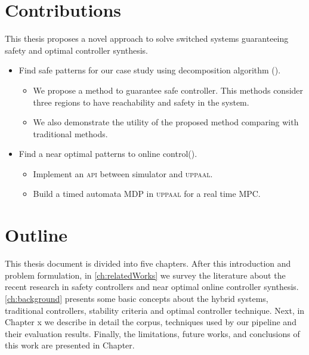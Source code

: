     \section{Contributions}
    \label{sec:contributions}
        This thesis proposes a novel approach to solve 
        switched systems guaranteeing safety and optimal
        controller synthesis. 
        \begin{itemize}
            \item Find safe patterns for our case study using
            decomposition algorithm (\cite{le2017improved}).
                \begin{itemize}
                    \item We propose a method to guarantee safe controller. This methods consider three regions to have reachability and safety in the system.
                    \item We also demonstrate the utility of the proposed method comparing with traditional methods.
                \end{itemize}
            \item Find a near optimal patterns to online control(\cite{larsen2016online}).
            \begin{itemize}
                \item Implement an \textsc{api} between simulator and \textsc{uppaal}.
                \item Build a timed automata MDP in \textsc{uppaal} for a real time \textsc{MPC}.
            \end{itemize}
        \end{itemize}

    \section{Outline}
    This thesis document is divided into five chapters. After this 
    introduction and problem formulation, in \autoref{ch:relatedWorks}
     we survey the literature about the recent research in safety
      controllers and near optimal online controller synthesis. 
    \autoref{ch:background} presents some basic concepts about the
    hybrid systems, traditional controllers,
    stability criteria and optimal controller technique. Next, in
    Chapter x we describe in detail the corpus, techniques used 
    by our pipeline and their evaluation results. Finally, the 
    limitations, future works, and conclusions of this work are 
    presented in Chapter.











